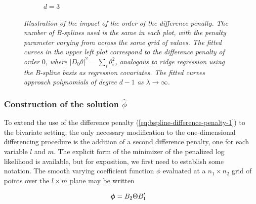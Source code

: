 \begin{figure}[H]
\begin{subfigure}{.5\textwidth}
\caption{$d=3$}
\end{subfigure}
\caption{\textit{Illustration of the impact of the order of the difference penalty. The number of B-splines used is the same in each plot, with the penalty parameter varying from across the same grid of values. The fitted curves in the upper left plot correspond to the difference penalty of order $0$, where $\vert D_0 \theta \vert^2 = \sum_{i} \theta_i^2$, analogous to ridge regression using the B-spline basis as regression covariates. The fitted curves approach polynomials of degree $d-1$ as $\lambda \rightarrow \infty$.}}
\label{fig:PS-difference-order-demo}
\end{figure}





\subsubsection{Construction of the solution $\hat{\phi}$}

To extend the use of the difference penalty (\ref{eq:bspline-difference-penalty-1}) to the bivariate setting, the only necessary modification to the one-dimensional differencing procedure is the addition of a second difference penalty, one for each variable $l$ and $m$. The explicit form of the minimizer of the penalized log likelihood is available, but for exposition, we first need to establish some notation. The smooth varying coefficient function $\phi$ evaluated at a $n_1 \times n_2$ grid of points over the $l \times m$ plane may be written 

\begin{equation*} 
\mbox{\boldmath $\phi$} = B_2 \Theta B'_1
\end{equation*}

